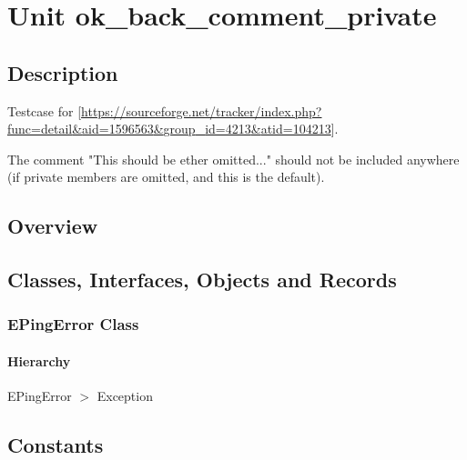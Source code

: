 \documentclass{report}
\newif\ifpdf
\begin{document}
\label{toc}\tableofcontents
\newpage
\newlength{\tmplength}
\chapter{Unit ok{\_}back{\_}comment{\_}private}
\label{ok_back_comment_private}
\section{Description}
Testcase for [\href{https://sourceforge.net/tracker/index.php?func=detail&aid=1596563&group_id=4213&atid=104213}{https://sourceforge.net/tracker/index.php?func=detail{\&}aid=1596563{\&}group{\_}id=4213{\&}atid=104213}].

The comment "This should be ether omitted..." should not be included anywhere (if private members are omitted, and this is the default).
\section{Overview}
\begin{description}
\item[\texttt{\begin{ttfamily}EPingError\end{ttfamily} Class}]
\end{description}
\section{Classes, Interfaces, Objects and Records}
\ifpdf
\subsection*{\large{\textbf{EPingError Class}}\normalsize\hspace{1ex}\hrulefill}
\else
\subsection*{EPingError Class}
\fi
\label{ok_back_comment_private.EPingError}
\subsubsection*{\large{\textbf{Hierarchy}}\normalsize\hspace{1ex}\hfill}
EPingError {$>$} Exception
\section{Constants}
\ifpdf
\end{document}
